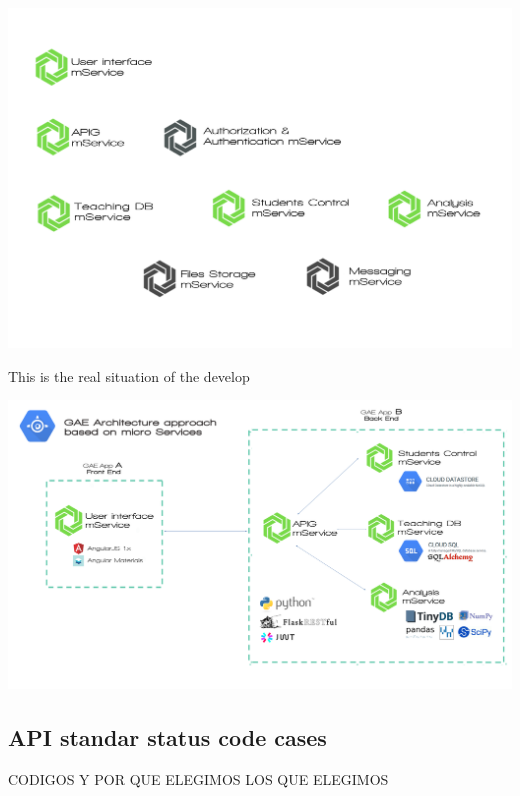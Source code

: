 \begin{center}
\includegraphics[scale=0.22]{img/graphics/final_microservices_distribution.png}
\end{center}

This is the real situation of the develop

\begin{center}
\includegraphics[scale=0.15]{img/graphics/GAE_final_architecture.png}
\end{center}

\subsection{API standar status code cases}

CODIGOS Y POR QUE ELEGIMOS LOS QUE ELEGIMOS



